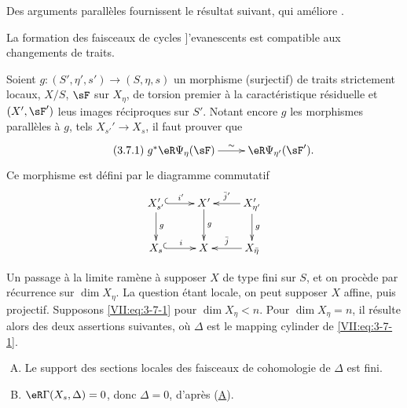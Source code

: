 Des arguments parall\`eles fournissent le r\'esultat suivant, qui am\'eliore 
\cite[XIII 2.1.12, 2.4.2]{sga7}. 





\begin{proposition_}\label{VII:3-7}
La formation des faisceaux de cycles ]'evanescents est compatible aux 
changements de traits. 
\end{proposition_}

Soient $g:(S',\eta',s') \to (S,\eta,s)$ un morphisme (surjectif) de traits 
strictement locaux, $X/S$, $\sF$ sur $X_\eta$, de torsion premier \`a la 
caract\'eristique r\'esiduelle et $(X',\sF')$ leus images r\'eciproques sur 
$S'$. Notant encore $g$ les morphismes parall\`eles \`a $g$, tels 
$X_{s'}' \to X_s$, il faut prouver que 
\begin{equation*}\tag{3.7.1}\label{VII:eq:3-7-1}
\xymatrix{
  g^\ast \eR\Psi_\eta(\sF) \ar[r]^-\sim 
    & \eR\Psi_{\eta'}(\sF') \text{.} 
}
\end{equation*}
Ce morphisme est d\'efini par le diagramme commutatif 
\[\xymatrix{
  X_{s'}' \ar@{^{(}->}[r]^-{i'} \ar[d]^-g 
    & X' \ar[d]^-g 
    & X_{\eta'}' \ar[l]_-{\bar j'} \ar[d]^-g \\
  X_s \ar@{^{(}->}[r]^-i 
    & X 
    & \ar[l]_-{\bar j} X_{\bar\eta} 
}\]

Un passage \`a la limite ram\`ene \`a supposer $X$ de type fini sur $S$, et on 
proc\`ede par r\'ecurrence sur $\dim{X_\eta}$. La question \'etant locale, on 
peut supposer $X$ affine, puis projectif. Supposons \eqref{VII:eq:3-7-1} pour 
$\dim{X_\eta}<n$. Pour $\dim{X_\eta}=n$, il r\'esulte alors des deux 
assertions suivantes, o\`u $\Delta$ est le mapping cylinder de 
\eqref{VII:eq:3-7-1}. 

\begin{enumerate}[(A)]
  \item Le support des sections locales des faisceaux de cohomologie de 
    $\Delta$ est fini. 
    \hypertarget{VII:3-A}{}
  \item $\eR\Gamma(X_s,\Delta)=0$, donc $\Delta=0$, d'apr\`es 
    (\hyperlink{VII:3-A}{A}). 
    \hypertarget{VII:3-B}{}
\end{enumerate}





\subsection{}\label{VII:3-8}

